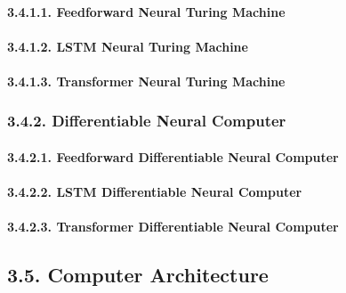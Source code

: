 \documentclass[
]{article}
\begin{document}
\hypertarget{feedforward-neural-turing-machine}{%
\paragraph{3.4.1.1. Feedforward Neural Turing
Machine}\label{feedforward-neural-turing-machine}}

\hypertarget{lstm-neural-turing-machine}{%
\paragraph{3.4.1.2. LSTM Neural Turing
Machine}\label{lstm-neural-turing-machine}}

\hypertarget{transformer-neural-turing-machine}{%
\paragraph{3.4.1.3. Transformer Neural Turing
Machine}\label{transformer-neural-turing-machine}}

\hypertarget{differentiable-neural-computer}{%
\subsubsection{3.4.2. Differentiable Neural
Computer}\label{differentiable-neural-computer}}

\hypertarget{feedforward-differentiable-neural-computer}{%
\paragraph{3.4.2.1. Feedforward Differentiable Neural
Computer}\label{feedforward-differentiable-neural-computer}}

\hypertarget{lstm-differentiable-neural-computer}{%
\paragraph{3.4.2.2. LSTM Differentiable Neural
Computer}\label{lstm-differentiable-neural-computer}}

\hypertarget{transformer-differentiable-neural-computer}{%
\paragraph{3.4.2.3. Transformer Differentiable Neural
Computer}\label{transformer-differentiable-neural-computer}}

\hypertarget{computer-architecture}{%
\subsection{3.5. Computer Architecture}\label{computer-architecture}}
\end{document}
